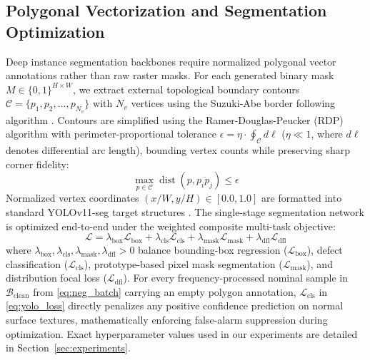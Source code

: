 \subsection{Polygonal Vectorization and Segmentation Optimization}
Deep instance segmentation backbones require normalized polygonal vector annotations rather than raw raster masks. For each generated binary mask $M \in \{0, 1\}^{H \times W}$, we extract external topological boundary contours $\mathcal{C} = \{p_1, p_2, \dots, p_{N_v}\}$ with $N_v$ vertices using the Suzuki-Abe border following algorithm \cite{suzuki1985topological}. Contours are simplified using the Ramer-Douglas-Peucker (RDP) algorithm \cite{douglas1973algorithms} with perimeter-proportional tolerance $\epsilon = \eta \cdot \oint_{\mathcal{C}} d\ell$ ($\eta \ll 1$, where $d\ell$ denotes differential arc length), bounding vertex counts while preserving sharp corner fidelity:
\begin{equation}
\max_{p \in \mathcal{C}} \operatorname{dist}(p, \overline{p_i p_j}) \le \epsilon
\end{equation}
Normalized vertex coordinates $(x/W, y/H) \in [0.0, 1.0]$ are formatted into standard YOLOv11-seg target structures \cite{ultralytics2024yolo11}. The single-stage segmentation network is optimized end-to-end under the weighted composite multi-task objective:
\begin{equation}
\label{eq:yolo_loss}
\mathcal{L} = \lambda_{\text{box}}\mathcal{L}_{\text{box}} + \lambda_{\text{cls}}\mathcal{L}_{\text{cls}} + \lambda_{\text{mask}}\mathcal{L}_{\text{mask}} + \lambda_{\text{dfl}}\mathcal{L}_{\text{dfl}}
\end{equation}
where $\lambda_{\text{box}}, \lambda_{\text{cls}}, \lambda_{\text{mask}}, \lambda_{\text{dfl}} > 0$ balance bounding-box regression ($\mathcal{L}_{\text{box}}$), defect classification ($\mathcal{L}_{\text{cls}}$), prototype-based pixel mask segmentation ($\mathcal{L}_{\text{mask}}$), and distribution focal loss ($\mathcal{L}_{\text{dfl}}$). For every frequency-processed nominal sample in $\mathcal{B}_{\text{clean}}$ from \eqref{eq:neg_batch} carrying an empty polygon annotation, $\mathcal{L}_{\text{cls}}$ in \eqref{eq:yolo_loss} directly penalizes any positive confidence prediction on normal surface textures, mathematically enforcing false-alarm suppression during optimization. Exact hyperparameter values used in our experiments are detailed in Section~\ref{sec:experiments}.
